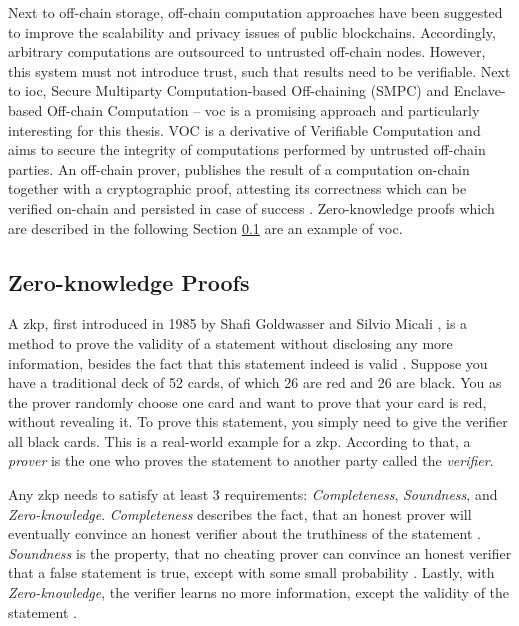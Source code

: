 Next to off-chain storage, off-chain computation approaches have been suggested to improve the scalability and privacy issues of public blockchains. Accordingly, arbitrary computations are outsourced to untrusted off-chain nodes. However, this system must not introduce trust, such that results need to be verifiable. Next to \acrfull{ioc}, Secure Multiparty Computation-based Off-chaining (SMPC) and Enclave-based Off-chain Computation -- \acrfull{voc} \cite{eberhardtOffchainingModelsApproaches2018} is a promising approach and particularly interesting for this thesis. VOC is a derivative of Verifiable Computation and aims to secure the integrity of computations performed by untrusted off-chain parties. An off-chain prover, publishes the result of a computation on-chain together with a cryptographic proof, attesting its correctness which can be verified on-chain and persisted in case of success \cite{eberhardtOffchainingModelsApproaches2018,eberhardtZoKratesScalablePrivacyPreserving2018a,simunicVerifiableComputingApplications2021,xuSlimChainScalingBlockchain}. Zero-knowledge proofs which are described in the following Section \ref{subsec:zkp} are an example of \acrshort{voc}.

\subsection{Zero-knowledge Proofs}
\label{subsec:zkp}

A \acrfull{zkp}, first introduced in 1985 by Shafi Goldwasser and Silvio Micali \cite{doi:10.1137/0218012}, is a method to prove the validity of a statement without disclosing any more information, besides the fact that this statement indeed is valid \cite{simunicVerifiableComputingApplications2021}. Suppose you have a traditional deck of 52 cards, of which 26 are red and 26 are black. You as the prover randomly choose one card and want to prove that your card is red, without revealing it. To prove this statement, you simply need to give the verifier all black cards. This is a real-world example for a \acrshort{zkp}. According to that, a \emph{prover} is the one who proves the statement to another party called the \emph{verifier}.

Any \acrshort{zkp} needs to satisfy at least 3 requirements: \emph{Completeness}, \emph{Soundness}, and \emph{Zero-knowledge}. \emph{Completeness} describes the fact, that an honest prover will eventually convince an honest verifier about the truthiness of the statement \cite{simunicVerifiableComputingApplications2021}. \emph{Soundness} is the property, that no cheating prover can convince an honest verifier that a false statement is true, except with some small probability \cite{simunicVerifiableComputingApplications2021}. Lastly, with \emph{Zero-knowledge}, the verifier learns no more information, except the validity of the statement \cite{simunicVerifiableComputingApplications2021}.

